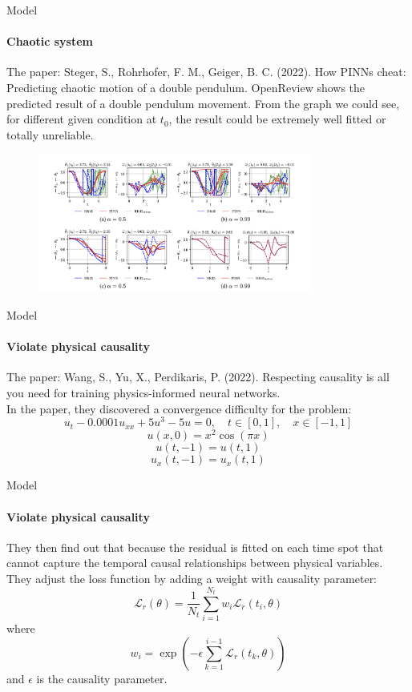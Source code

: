 \begin{frame}{Model}
\framesubtitle{Chaotic system}
    The paper: Steger, S., Rohrhofer, F. M.,  Geiger, B. C. (2022). How PINNs cheat: Predicting chaotic motion of a double pendulum. OpenReview shows the predicted result of a double pendulum movement.
    From the graph we could see, for different given condition at \(t_0\), the result could be extremely well fitted or totally unreliable.
    \begin{figure}[H]
        \centering
        \includegraphics[width=0.8\textwidth]{img/Screenshot 2024-06-02 at 4.02.10 PM}
    \end{figure} 
\end{frame}

\begin{frame}{Model}
\framesubtitle{Violate physical causality}
    The paper: Wang, S., Yu, X.,  Perdikaris, P. (2022). Respecting causality is all you need for training physics-informed neural networks. \\

    In the paper, they discovered a convergence difficulty for the problem:
    \begin{equation}
    u_t - 0.0001u_{xx} + 5u^3 - 5u = 0, \quad t \in [0, 1], \quad x \in [-1, 1]
    \end{equation}
    \begin{equation}
    u(x, 0) = x^2 \cos(\pi x)
    \end{equation}
    \begin{equation}
    u(t, -1) = u(t, 1)
    \end{equation}
    \begin{equation}
    u_x(t, -1) = u_x(t, 1)
    \end{equation}
\end{frame}

\begin{frame}{Model}
\framesubtitle{Violate physical causality}
    They then find out that because the residual is fitted on each time spot that cannot capture the temporal causal relationships between physical variables. They adjust the loss function by adding a weight with causality parameter:
    \begin{equation}
    \mathcal{L}_r(\theta) = \frac{1}{N_t} \sum_{i=1}^{N_t} w_i \mathcal{L}_r(t_i, \theta)
    \end{equation}
    where
    \begin{equation}
    w_i = \exp \left( -\epsilon \sum_{k=1}^{i-1} \mathcal{L}_r(t_k, \theta) \right)
    \end{equation}
    and \(\epsilon\) is the causality parameter.
\end{frame}

